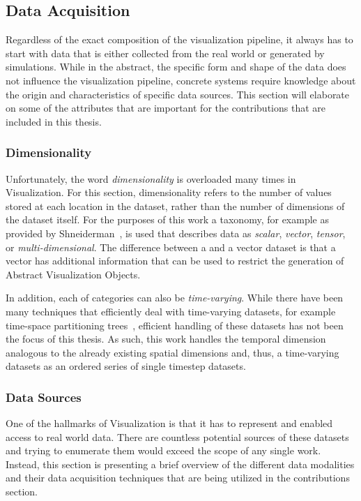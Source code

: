 \subsection{Data Acquisition} \label{cha:intro:vp:da}
Regardless of the exact composition of the visualization pipeline, it always has to start with data that is either collected from the real world or generated by simulations.  While in the abstract, the specific form and shape of the data does not influence the visualization pipeline, concrete systems require knowledge about the origin and characteristics of specific data sources.  This section will elaborate on some of the attributes that are important for the contributions that are included in this thesis.

\subsubsection{Dimensionality} \label{cha:intro:vp:da:dimensionality}
Unfortunately, the word \emph{dimensionality} is overloaded many times in Visualization.  For this section, dimensionality refers to the number of values stored at each location in the dataset, rather than the number of dimensions of the dataset itself.  For the purposes of this work a taxonomy, for example as provided by Shneiderman~\cite{shneiderman1996eyes}, is used that describes data as \emph{scalar}, \emph{vector}, \emph{tensor}, or \emph{multi-dimensional}.  The difference between a  and a vector dataset is that a vector has additional information that can be used to restrict the generation of Abstract Visualization Objects.

In addition, each of categories can also be \emph{time-varying}.  While there have been many techniques that efficiently deal with time-varying datasets, for example time-space partitioning trees~\cite{shen1999fast}, efficient handling of these datasets has not been the focus of this thesis.  As such, this work handles the temporal dimension analogous to the already existing spatial dimensions and, thus, a time-varying datasets as an ordered series of single timestep datasets.

\subsubsection{Data Sources} \label{cha:intro:vp:da:sources}
One of the hallmarks of Visualization is that it has to represent and enabled access to real world data.  There are countless potential sources of these datasets and trying to enumerate them would exceed the scope of any single work.  Instead, this section is presenting a brief overview of the different data modalities and their data acquisition techniques that are being utilized in the contributions section.

